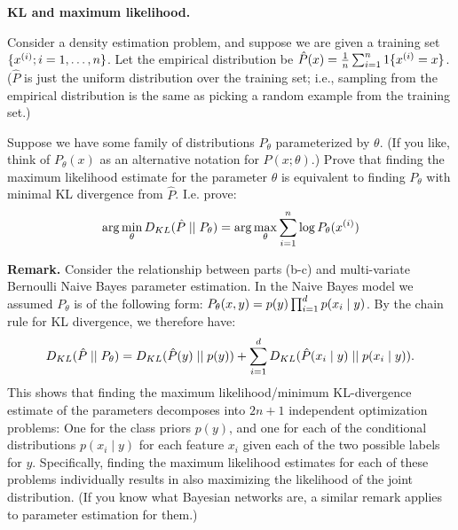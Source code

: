 \item {} \textbf{KL and maximum likelihood.}

Consider a density estimation problem, and suppose we are given a training set $\{x^{(i)}; i=1,\ldots, {n}\}$.  Let the empirical distribution be $\hat{P}(x) = \frac{1}{{n}}\sum_{i=1}^{{n}} 1\{x^{(i)}=x\}$. ($\hat{P}$ is just the uniform distribution over the training set; i.e., sampling from the empirical distribution is the same as picking a random example from the training set.)

Suppose we have some family of distributions $P_\theta$ parameterized by $\theta$.
(If you like, think of $P_\theta(x)$ as an alternative notation for $P(x;\theta)$.)
Prove that finding the maximum likelihood estimate for the parameter $\theta$ is equivalent to finding $P_{\theta}$ with minimal KL divergence from $\hat{P}$. I.e. prove:
\[
\arg\min_\theta D_{KL}(\hat{P}\mid \mid P_\theta)
= \arg\max_\theta \sum_{i=1}^{n} \log P_\theta(x^{(i)})
\]

{\bf Remark.} Consider the relationship between parts (b-c) and multi-variate Bernoulli Naive Bayes parameter estimation. In the Naive Bayes model we assumed $P_\theta$ is of the following form: $P_{\theta}(x,y) = p(y)\prod_{i=1}^{{d}} p(x_i\mid y)$.  By the chain rule for KL divergence, we therefore have:
$$
D_{KL}(\hat{P}\mid \mid P_\theta)
= D_{KL}(\hat{P}(y)\mid \mid p(y)) + \sum_{i=1}^{{d}} D_{KL}(\hat{P}(x_i\mid y)\mid \mid p(x_i\mid y)).
$$
This shows that finding the maximum likelihood/minimum KL-divergence estimate of the parameters decomposes into $2n+1$ independent optimization problems: One for the class priors $p(y)$, and one for each of the conditional distributions $p(x_i\mid y)$ for each feature $x_i$ given each of the two possible labels for $y$.  Specifically, finding the maximum likelihood estimates for each of these problems individually results in also maximizing the likelihood of the joint distribution.  (If you know what Bayesian networks are, a similar remark applies to parameter estimation for them.)

